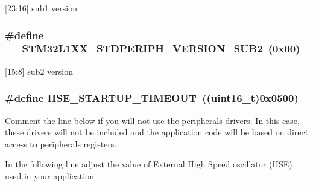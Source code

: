 \mbox{[}23\-:16\mbox{]} sub1 version \hypertarget{group___library__configuration__section_ga0c6790058c040671530172ceab0539ae}{
\subsubsection[{\-\_\-\-\_\-\-S\-T\-M32\-L1\-X\-X\-\_\-\-S\-T\-D\-P\-E\-R\-I\-P\-H\-\_\-\-V\-E\-R\-S\-I\-O\-N\-\_\-\-S\-U\-B2}]{\setlength{\rightskip}{0pt plus 5cm}\#define \-\_\-\-\_\-\-S\-T\-M32\-L1\-X\-X\-\_\-\-S\-T\-D\-P\-E\-R\-I\-P\-H\-\_\-\-V\-E\-R\-S\-I\-O\-N\-\_\-\-S\-U\-B2~(0x00)}}\label{group___library__configuration__section_ga0c6790058c040671530172ceab0539ae}
\mbox{[}15\-:8\mbox{]} sub2 version \hypertarget{group___library__configuration__section_ga68ecbc9b0a1a40a1ec9d18d5e9747c4f}{
\subsubsection[{H\-S\-E\-\_\-\-S\-T\-A\-R\-T\-U\-P\-\_\-\-T\-I\-M\-E\-O\-U\-T}]{\setlength{\rightskip}{0pt plus 5cm}\#define H\-S\-E\-\_\-\-S\-T\-A\-R\-T\-U\-P\-\_\-\-T\-I\-M\-E\-O\-U\-T~((uint16\-\_\-t)0x0500)}}\label{group___library__configuration__section_ga68ecbc9b0a1a40a1ec9d18d5e9747c4f}


Comment the line below if you will not use the peripherals drivers. In this case, these drivers will not be included and the application code will be based on direct access to peripherals registers. 

In the following line adjust the value of External High Speed oscillator (H\-S\-E) used in your application

